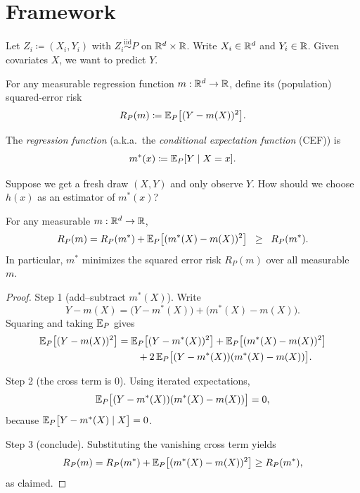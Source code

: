 
\section{Framework}



\begin{notation}	Let $Z_i \coloneqq (X_i,Y_i)$ with $Z_i \overset{\text{iid}}{\sim} P$ on $\mathbb{R}^d\times \mathbb{R}$.
	Write $X_i\in \mathbb{R}^d$ and $Y_i\in \mathbb{R}$.
	Given covariates $X$, we want to predict $Y$.
\end{notation}

\begin{definition}
	For any measurable regression function $m:\mathbb{R}^d\to \mathbb{R}$, define its (population) squared-error risk
	\[
		R_P(m) \coloneqq \mathbb{E}_P\big[(Y - m(X))^2\big].
	\]
\end{definition}

\begin{definition}
	The \emph{regression function} (a.k.a.\ the \emph{conditional expectation function} (CEF)) is
	\[
		m^*(x) \coloneqq \mathbb{E}_P[Y \mid X=x].
	\]
\end{definition}

Suppose we get a fresh draw $(X,Y)$ and only observe $Y$. How should we choose $h(x)$ as an estimator of $m^*(x)$?

\begin{proposition}
	For any measurable $m:\mathbb{R}^d\to \mathbb{R}$,
	\[
		R_P(m) = R_P(m^*) + \mathbb{E}_P\big[(m^*(X)-m(X))^2\big]
		\;\;\ge\;\;
		R_P(m^*).
	\]
	In particular, $m^*$ minimizes the squared error risk $R_P(m)$ over all measurable $m$.
\end{proposition}


\begin{proof}
	Step 1 (add--subtract $m^*(X)$).
	Write
	\[
		Y-m(X) = \bigl(Y-m^*(X)\bigr) + \bigl(m^*(X)-m(X)\bigr).
	\]
	Squaring and taking $\mathbb{E}_P$ gives
	\begin{align*}
		\mathbb{E}_P\big[(Y-m(X))^2\big]
		&= \mathbb{E}_P\big[(Y-m^*(X))^2\big]
		+ \mathbb{E}_P\big[(m^*(X)-m(X))^2\big] \\
		&\qquad
		+ 2\,\mathbb{E}_P\big[(Y-m^*(X))(m^*(X)-m(X))\big].
	\end{align*}

	Step 2 (the cross term is $0$).
	Using iterated expectations,
	\[
		\mathbb{E}_P\big[(Y-m^*(X))(m^*(X)-m(X))\big] = 0,
	\]
	because $\mathbb{E}_P\big[Y-m^*(X)\mid X\big] = 0$.

	Step 3 (conclude).
	Substituting the vanishing cross term yields
	\[
		R_P(m)=R_P(m^*)+\mathbb{E}_P\big[(m^*(X)-m(X))^2\big]\ge R_P(m^*),
	\]
	as claimed.
\end{proof}

